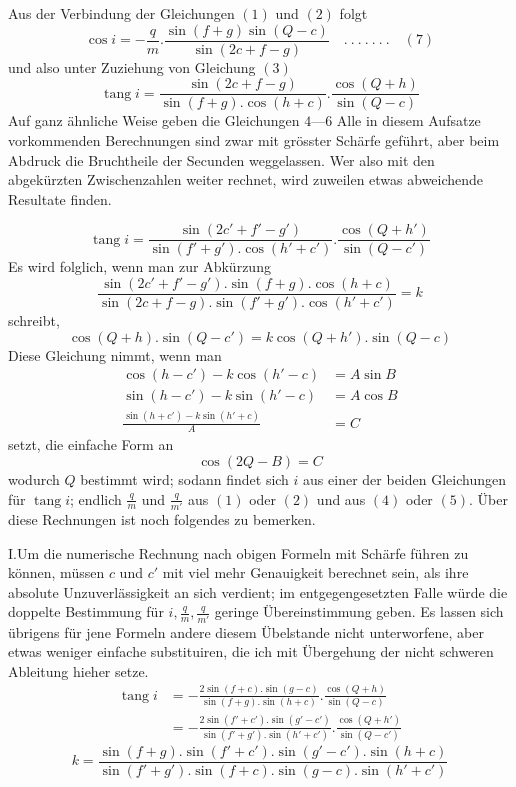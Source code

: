 Aus der Verbindung der Gleichungen $(1)$ und $(2)$ folgt
\[
\cos i=-\frac{q}{m}.\frac{\sin(f+g)\sin(Q-c)}{\sin(2c+f-g)}\quad.\ .\ .\ .\ .\ .\ .\quad(7)
\]
und also unter Zuziehung von Gleichung $(3)$
\[
\operatorname{tang}i=\frac{\sin(2c+f-g)}{\sin(f+g).\cos(h+c)}.\frac{\cos(Q+h)}{\sin(Q-c)}
\]
Auf ganz ähnliche Weise geben die Gleichungen $4$---$6$
\expandafter\def\csname HistoricalNoteText473\endcsname{Alle in diesem Aufsatze vorkommenden Berechnungen sind zwar mit grösster Schärfe geführt, aber beim Abdruck die Bruchtheile der Secunden weggelassen. Wer also mit den abgekürzten Zwischenzahlen weiter rechnet, wird zuweilen etwas abweichende Resultate finden.}
\par\clearpage
{}
\[
\operatorname{tang}i=\frac{\sin(2c'+f'-g')}{\sin(f'+g').\cos(h'+c')}.\frac{\cos(Q+h')}{\sin(Q-c')}
\]
Es wird folglich, wenn man zur Abkürzung
\[
\frac{\sin(2c'+f'-g').\sin(f+g).\cos(h+c)}{\sin(2c+f-g).\sin(f'+g').\cos(h'+c')}=k
\]
schreibt,
\[
\cos(Q+h).\sin(Q-c')=k\cos(Q+h').\sin(Q-c)
\]
Diese Gleichung nimmt, wenn man
\[
\begin{aligned}
\cos(h-c')-k\cos(h'-c)&=A\sin B\\
\sin(h-c')-k\sin(h'-c)&=A\cos B\\
\frac{\sin(h+c')-k\sin(h'+c)}{A}&=C
\end{aligned}
\]
setzt, die einfache Form an
\[
\cos(2Q-B)=C
\]
wodurch $Q$ bestimmt wird; sodann findet sich $i$ aus einer der beiden Gleichungen für $\operatorname{tang}i$; endlich $\frac{q}{m}$ und $\frac{q}{m'}$ aus $(1)$ oder $(2)$ und aus $(4)$ oder $(5)$. Über diese Rechnungen ist noch folgendes zu bemerken.

I.\quad Um die numerische Rechnung nach obigen Formeln mit Schärfe führen zu können, müssen $c$ und $c'$ mit viel mehr Genauigkeit berechnet sein, als ihre absolute Unzuverlässigkeit an sich verdient; im entgegengesetzten Falle würde die doppelte Bestimmung für $i,\frac{q}{m},\frac{q}{m'}$ geringe Übereinstimmung geben. Es lassen sich übrigens für jene Formeln andere diesem Übelstande nicht unterworfene, aber etwas weniger einfache substituiren, die ich mit Übergehung der nicht schweren Ableitung hieher setze.
\[
\begin{aligned}
\operatorname{tang}i&=-\frac{2\sin(f+c).\sin(g-c)}{\sin(f+g).\sin(h+c)}.\frac{\cos(Q+h)}{\sin(Q-c)}\\
&=-\frac{2\sin(f'+c').\sin(g'-c')}{\sin(f'+g').\sin(h'+c')}.\frac{\cos(Q+h')}{\sin(Q-c')}
\end{aligned}
\]
\[
k=\frac{\sin(f+g).\sin(f'+c').\sin(g'-c').\sin(h+c)}{\sin(f'+g').\sin(f+c).\sin(g-c).\sin(h'+c')}
\]

